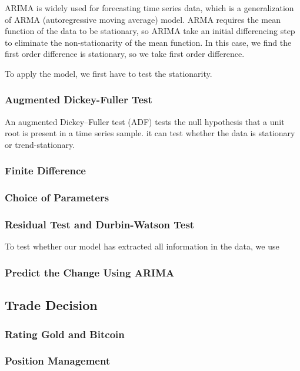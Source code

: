 \documentclass[12pt,a4paper]{article}
\newcommand{\Predictor}{ARIMA }
\begin{document}
\begin{spacing}{1.2}
\Predictor is widely used for forecasting time series data, which is a generalization of ARMA (autoregressive moving average) model. ARMA requires the mean function of the data to be stationary, so ARIMA take an initial differencing step to eliminate the non-stationarity of the mean function. In this case, we find the first order difference is stationary, so we take first order difference. 

To apply the model, we first have to test the stationarity.

\subsubsection{Augmented Dickey-Fuller Test}

An augmented Dickey–Fuller test (ADF) tests the null hypothesis that a unit root is present in a time series sample. it can test whether the data is stationary or trend-stationary.

\subsubsection{Finite Difference}

\subsubsection{Choice of Parameters}

\subsubsection{Residual Test and Durbin-Watson Test}
To test whether our model has extracted all information in the data, we use

\subsubsection{Predict the Change Using \Predictor}

\subsection{Trade Decision}

\subsubsection{Rating Gold and Bitcoin}

\subsubsection{Position Management}



\end{spacing}
\end{document}
